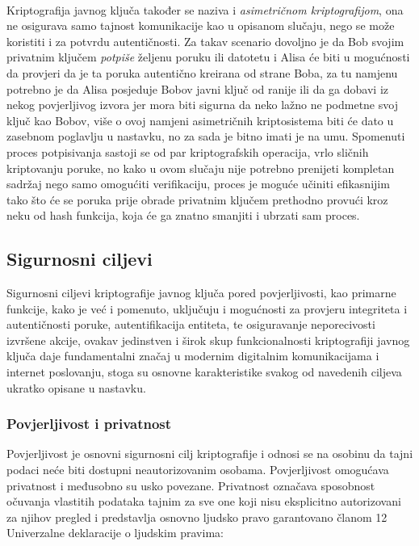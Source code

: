 \paragraph*{}
Kriptografija javnog ključa također se naziva i \textit{asimetričnom kriptografijom}, ona ne osigurava samo tajnost komunikacije kao u opisanom slučaju, nego se može koristiti i za potvrdu autentičnosti. Za takav scenario dovoljno je da Bob svojim privatnim ključem \textit{potpiše} željenu poruku ili datotetu i Alisa će biti u mogućnosti da provjeri da je ta poruka autentično kreirana od strane Boba, za tu namjenu potrebno je da Alisa posjeduje Bobov javni ključ od ranije ili da ga dobavi iz nekog povjerljivog izvora jer mora biti sigurna da neko lažno ne podmetne svoj ključ kao Bobov, više o ovoj namjeni asimetričnih kriptosistema biti će dato u zasebnom poglavlju u nastavku, no za sada je bitno imati je na umu. Spomenuti proces potpisivanja sastoji se od par kriptografskih operacija, vrlo sličnih kriptovanju poruke, no kako u ovom slučaju nije potrebno prenijeti kompletan sadržaj nego samo omogućiti verifikaciju, proces je moguće učiniti efikasnijim tako što će se poruka prije obrade privatnim ključem prethodno provući kroz neku od hash funkcija, koja će ga znatno smanjiti i ubrzati sam proces.

\subsection{Sigurnosni ciljevi}
Sigurnosni ciljevi kriptografije javnog ključa pored povjerljivosti, kao primarne funkcije, kako je već i pomenuto, uključuju i mogućnosti za provjeru integriteta i autentičnosti poruke, autentifikacija entiteta, te osiguravanje neporecivosti izvršene akcije\cite{buchmann2013introduction}, ovakav jedinstven i širok skup funkcionalnosti kriptografiji javnog ključa daje fundamentalni značaj u modernim digitalnim komunikacijama i internet poslovanju, stoga su osnovne karakteristike svakog od navedenih ciljeva ukratko opisane u nastavku.

\subsubsection*{Povjerljivost i privatnost}
Povjerljivost je osnovni sigurnosni cilj kriptografije i odnosi se na osobinu da tajni podaci neće biti dostupni neautorizovanim osobama. Povjerljivost omogućava privatnost i međusobno su usko povezane. Privatnost označava sposobnost očuvanja vlastitih podataka tajnim za sve one koji nisu eksplicitno autorizovani za njihov pregled i predstavlja osnovno ljudsko pravo garantovano članom 12 Univerzalne deklaracije o ljudskim pravima\cite{assembly1948universal}:

